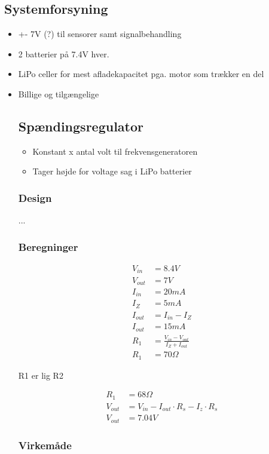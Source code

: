 \subsection{Systemforsyning}
\begin{itemize}
	\item +- 7V (?) til sensorer samt signalbehandling
	\item 2 batterier på 7.4V hver. 
	\item LiPo celler for mest afladekapacitet pga. motor som trækker en del
	\item Billige og tilgængelige
	
\subsection{Spændingsregulator}
\begin{itemize}
	\item Konstant x antal volt til frekvensgeneratoren
	\item Tager højde for voltage sag i LiPo batterier
\end{itemize}

	
	\subsubsection{Design}
	...
	
	\subsubsection{Beregninger}
	
	\begin{equation}
	\label{eq:RegulatorDesign}
	\begin{split}
	V_{in} & = 8.4V \\
	V_{out} & = 7V \\
	I_{in} & = 20mA \\
	I_Z & = 5mA \\
	I_{out} & = I_{in} - I_Z \\
	I_{out} & = 15mA \\
	R_1 & = \frac{V_{in} - V_{out}}{I_Z + I_{out}} \\
	R_1 & = 70 \Omega 
	\end{split}
	\end{equation}
	
	R1 er lig R2
	
	\begin{equation}
	\label{eq:RegulatorDesignTilnaermelse}
	\begin{split}
	R_1 & = 68 \Omega \\
	V_{out} & = V_{in} - I_{out} \cdot R_s - I_z \cdot R_s \\
	V_{out} & = 7.04V
	\end{split}
	\end{equation}
	
	\subsubsection{Virkemåde}
\end{itemize}


